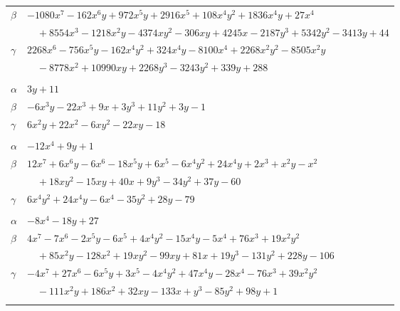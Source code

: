 \documentclass[11pt]{article}
\begin{document}
\begin{longtable}{@{}ll@{}}
$\beta$ & $-1080x^{7}-162x^{6}y+972x^{5}y+2916x^{5}+108x^{4}y^{2}+1836x^{4}y+27x^{4}$\\
 & $\quad +8554x^{3}-1218x^{2}y-4374xy^{2}-306xy+4245x-2187y^{3}+5342y^{2}-3413y+44$\\
$\gamma$ & $2268x^{6}-756x^{5}y-162x^{4}y^{2}+324x^{4}y-8100x^{4}+2268x^{2}y^{2}-8505x^{2}y$\\
 & $\quad -8778x^{2}+10990xy+2268y^{3}-3243y^{2}+339y+288$\\
\addlinespace[3pt]
\multicolumn{2}{@{}l}{$\{i,j\}=\{7,9\}$, $k_{ij}=2\cdot 5$}\\
$\alpha$ & $3y+11$\\
$\beta$ & $-6x^{3}y-22x^{3}+9x+3y^{3}+11y^{2}+3y-1$\\
$\gamma$ & $6x^{2}y+22x^{2}-6xy^{2}-22xy-18$\\
\addlinespace[3pt]
\multicolumn{2}{@{}l}{$\{i,j\}=\{7,11\}$, $k_{ij}=2^{2}\cdot 5$}\\
$\alpha$ & $-12x^{4}+9y+1$\\
$\beta$ & $12x^{7}+6x^{6}y-6x^{6}-18x^{5}y+6x^{5}-6x^{4}y^{2}+24x^{4}y+2x^{3}+x^{2}y-x^{2}$\\
 & $\quad +18xy^{2}-15xy+40x+9y^{3}-34y^{2}+37y-60$\\
$\gamma$ & $6x^{4}y^{2}+24x^{4}y-6x^{4}-35y^{2}+28y-79$\\
\addlinespace[3pt]
\multicolumn{2}{@{}l}{$\{i,j\}=\{8,10\}$, $k_{ij}=2^{2}\cdot 7$}\\
$\alpha$ & $-8x^{4}-18y+27$\\
$\beta$ & $4x^{7}-7x^{6}-2x^{5}y-6x^{5}+4x^{4}y^{2}-15x^{4}y-5x^{4}+76x^{3}+19x^{2}y^{2}$\\
 & $\quad +85x^{2}y-128x^{2}+19xy^{2}-99xy+81x+19y^{3}-131y^{2}+228y-106$\\
$\gamma$ & $-4x^{7}+27x^{6}-6x^{5}y+3x^{5}-4x^{4}y^{2}+47x^{4}y-28x^{4}-76x^{3}+39x^{2}y^{2}$\\
 & $\quad -111x^{2}y+186x^{2}+32xy-133x+y^{3}-85y^{2}+98y+1$\\
\addlinespace[3pt]
\end{longtable}
\endgroup
\end{document}
